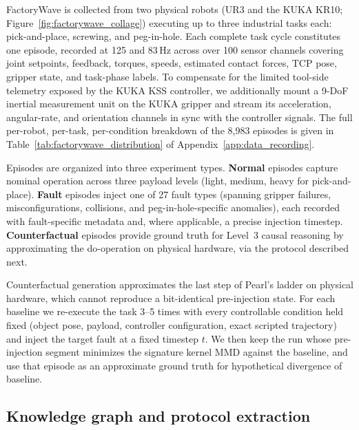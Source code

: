 \documentclass{article}
\begin{document}
FactoryWave is collected from two physical robots (UR3 and the KUKA KR10; Figure~\ref{fig:factorywave_collage}) executing up to three industrial tasks each: pick-and-place, screwing, and peg-in-hole. Each complete task cycle constitutes one episode, recorded at 125 and 83\,Hz across over 100 sensor channels covering joint setpoints, feedback, torques, speeds, estimated contact forces, TCP pose, gripper state, and task-phase labels. To compensate for the limited tool-side telemetry exposed by the KUKA KSS controller, we additionally mount a 9-DoF inertial measurement unit on the KUKA gripper and stream its acceleration, angular-rate, and orientation channels in sync with the controller signals. The full per-robot, per-task, per-condition breakdown of the 8{,}983 episodes is given in Table~\ref{tab:factorywave_distribution} of Appendix~\ref{app:data_recording}.

Episodes are organized into three experiment types. \textbf{Normal} episodes capture nominal operation across three payload levels (light, medium, heavy for pick-and-place). \textbf{Fault} episodes inject one of 27 fault types (spanning gripper failures, misconfigurations, collisions, and peg-in-hole-specific anomalies), each recorded with fault-specific metadata and, where applicable, a precise injection timestep. \textbf{Counterfactual} episodes provide ground truth for Level~3 causal reasoning by approximating the do-operation on physical hardware, via the protocol described next.

Counterfactual generation approximates the last step of Pearl's ladder on physical hardware, which cannot reproduce a bit-identical pre-injection state. For each baseline we re-execute the task 3--5 times with every controllable condition held fixed (object pose, payload, controller configuration, exact scripted trajectory) and inject the target fault at a fixed timestep $t$. We then keep the run whose pre-injection segment minimizes the signature kernel MMD against the baseline, and use that episode as an approximate ground truth for hypothetical divergence of baseline.

\subsection{Knowledge graph and protocol extraction}
\label{sec:knowledge-graph}
\end{document}
